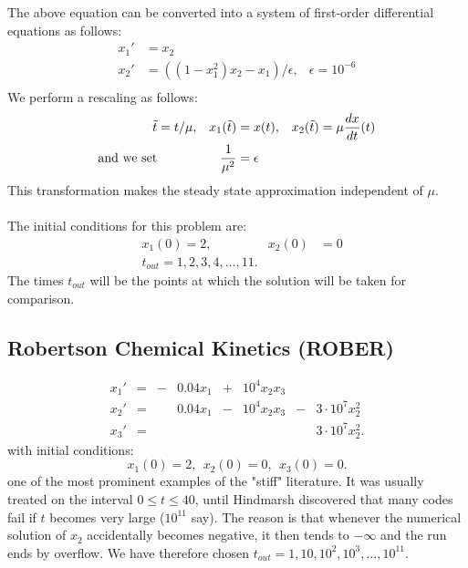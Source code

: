 \documentclass[notitlepage,12pt]{article}
\begin{document}
The above equation can be converted into a system of first-order differential equations as follows:
\begin{equation}
\begin{aligned}
	x_1' &= x_2\\
	x_2' &= \left(\left(1-x_1^2\right)x_2-x_1\right)/\epsilon, &\epsilon = 10^{-6}\\
\end{aligned}
\end{equation}
We perform a rescaling as follows:
\begin{equation}
\begin{aligned}
\tilde{t} &= t/\mu, &x_1(\tilde{t})&=x(t), &x_2(\tilde{t})=\mu \frac{dx}{dt}(t)\\
\textnormal{and we set}& &\frac{1}{\mu^2} &= \epsilon
\end{aligned}
\end{equation}
This transformation makes the steady state approximation independent of $\mu$.\\ \\
The initial conditions for this problem are:
\begin{equation}
\begin{aligned}
&x_1(0) =2, &x_2(0)&= 0\\
&t_{out} =1,2,3,4,\ldots,11.
\end{aligned}
\end{equation}
The times $t_{out}$ will be the points at which the solution will be taken for comparison.


\subsection{Robertson Chemical Kinetics (ROBER)}
\label{sub:rober}

\begin{equation}
\begin{aligned}
x_1' &= &-&0.04x_1 &+ &10^4x_2x_3\\
x_2' &= & &0.04x_1 &- &10^4x_2x_3 &-&3\cdot 10^7x_2^2\\
x_3' &= & &        &  &           & &3\cdot 10^7x_2^2.
\end{aligned}
\end{equation}
with initial conditions:
\begin{equation}
x_1(0) = 2, \ \ x_2(0) = 0, \ \ x_3(0) = 0.
\end{equation}
one of the most prominent examples of the "stiff" literature. It was usually treated on the interval $0 \leq t \leq 40$, until Hindmarsh discovered that many codes fail if $t$ becomes very large ($10^{11}$ say). The reason is that whenever the numerical solution of $x_2$ accidentally becomes negative, it then tends to $-\infty$ and the run ends by overflow. We have therefore chosen $t_{out} = 1,10,10^2,10^3,\ldots,10^{11}$.
\end{document}
